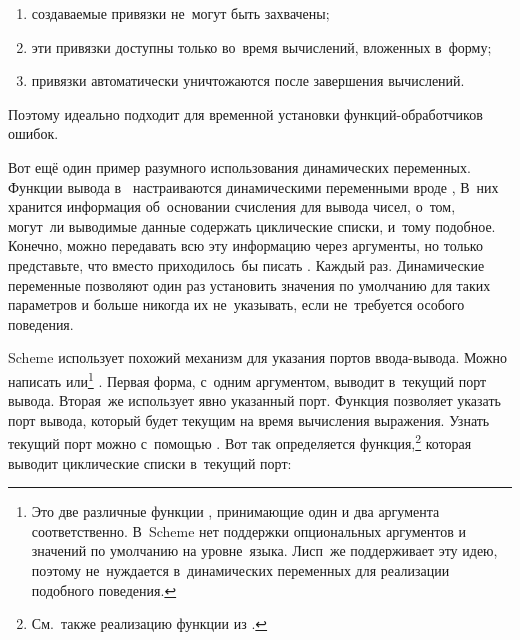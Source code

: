 \begin{enumerate}
  \item создаваемые привязки не~могут быть захвачены;
  
  \item эти привязки доступны только во~время вычислений,
        вложенных в~форму;
  
  \item привязки автоматически уничтожаются после завершения
        вычислений.
\end{enumerate}

\noindent
Поэтому  идеально подходит для временной установки
функций-обработчиков ошибок.

Вот ещё один пример разумного использования динамических переменных. Функции
вывода в~{\CommonLisp} настраиваются динамическими переменными вроде
,  {\itd} В~них хранится информация
об~основании счисления для вывода чисел, о~том, могут~ли выводимые данные
содержать циклические списки, и~тому подобное. Конечно, можно передавать всю
эту информацию через аргументы, но только представьте, что вместо  приходилось~бы писать . Каждый раз. Динамические переменные позволяют один
раз установить значения по умолчанию для таких параметров и больше никогда их
не~указывать, если не~требуется особого поведения.

Scheme использует похожий механизм для указания портов ввода-вывода. Можно
написать  или\footnote{Это две различные функции
, принимающие один и два аргумента соответственно. В~Scheme нет
поддержки опциональных аргументов и значений по умолчанию на уровне~языка.
Лисп~же поддерживает эту идею, поэтому не~нуждается в~динамических переменных
для реализации подобного поведения.} .
Первая форма, с~одним аргументом, выводит  в~текущий порт вывода.
Вторая~же использует явно указанный порт. Функция 
позволяет указать порт вывода, который будет текущим на время вычисления
выражения. Узнать текущий порт можно с~помощью . Вот так
определяется функция,\footnote*{См.~также реализацию функции  из
{\CommonLisp}.} которая выводит циклические списки в~текущий порт:

